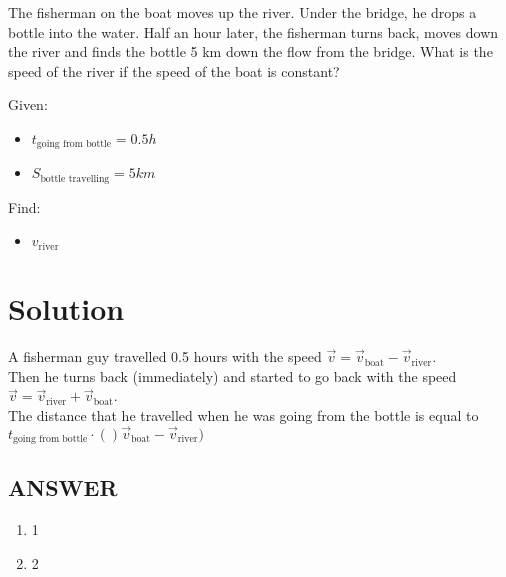 The fisherman on the boat moves up the river. Under the bridge, he drops a bottle into the water.
Half an hour later, the fisherman turns back, moves down the river and finds the bottle 5 km
down the flow from the bridge. What is the speed of the river if the speed of the boat is constant?

\bigbreak Given: \begin{itemize}
    \item $t_{\text{going from bottle}} = 0.5h$
    \item $S_{\text{bottle travelling}} = 5km$
\end{itemize}

Find: \begin{itemize}
    \item $v_{\text{river}}$
\end{itemize}

\section*{Solution}

A fisherman guy travelled 0.5 hours with the speed $\Vec{v} = \Vec{v}_{\text{boat}} - \Vec{v}_{\text{river}}$.
\\ Then he turns back (immediately) and started to go back with the speed $\Vec{v} = \Vec{v}_{\text{river}} + \Vec{v}_{\text{boat}}$.
\\ The distance that he travelled when he was going from the bottle is equal to $t_{\text{going from bottle}} \cdot ()\Vec{v}_{\text{boat}} - \Vec{v}_{\text{river}})$ 



\vfill
\subsection*{ANSWER}
\begin{enumerate}
    \item 1
    \item 2
\end{enumerate}

